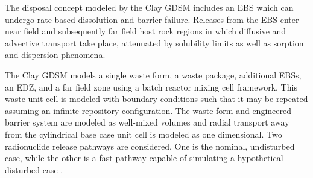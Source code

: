 The disposal concept modeled by the Clay \gls{GDSM} includes an \gls{EBS} which 
can undergo rate based dissolution and barrier failure. Releases from the \gls{EBS} enter 
near field and subsequently far field host rock regions in which diffusive and 
advective transport take place, attenuated by solubility limits as well as 
sorption and dispersion phenomena.  

The Clay \gls{GDSM} models a single waste form, a waste package, additional 
\glspl{EBS}, 
an \gls{EDZ}, and a far field zone using a batch reactor mixing cell framework. This waste unit cell is modeled 
with boundary conditions such that it may be repeated assuming an infinite 
repository configuration. The waste form and engineered barrier system are modeled as well-mixed volumes 
and radial transport away from the cylindrical base case unit cell is modeled as  
one dimensional. Two radionuclide release pathways are considered. One is the nominal, 
undisturbed case, while the other is a fast pathway capable of simulating a 
hypothetical disturbed case 
\cite{clayton_generic_2011}.
